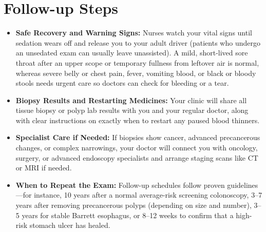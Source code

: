\section{Follow-up Steps}
\begin{itemize}
\item \textbf{Safe Recovery and Warning Signs:} Nurses watch your vital signs until sedation wears off and release you to your adult driver (patients who undergo an unsedated exam can usually leave unassisted). A mild, short-lived sore throat after an upper scope or temporary fullness from leftover air is normal, whereas severe belly or chest pain, fever, vomiting blood, or black or bloody stools needs urgent care so doctors can check for bleeding or a tear.
\item \textbf{Biopsy Results and Restarting Medicines:} Your clinic will share all tissue biopsy or polyp lab results with you and your regular doctor, along with clear instructions on exactly when to restart any paused blood thinners.
\item \textbf{Specialist Care if Needed:} If biopsies show cancer, advanced precancerous changes, or complex narrowings, your doctor will connect you with oncology, surgery, or advanced endoscopy specialists and arrange staging scans like CT or MRI if needed.
\item \textbf{When to Repeat the Exam:} Follow-up schedules follow proven guidelines---for instance, 10 years after a normal average-risk screening colonoscopy, 3--7 years after removing precancerous polyps (depending on size and number), 3--5 years for stable Barrett esophagus, or 8--12 weeks to confirm that a high-risk stomach ulcer has healed.
\end{itemize}

